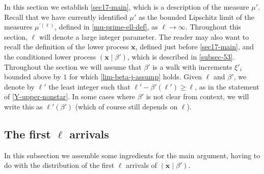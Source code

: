 \documentclass[11pt,reqno]{amsart}
\numberwithin{equation}{section}
\theoremstyle{definition}
\theoremstyle{remark}
\newcommand{\mbf}{\mathbf}
\renewcommand{\ge}{\geqslant}
\begin{document}
In this section we establish \cref{sec17-main}, which is a description of the measure $\mu'$. Recall that we have currently identified $\mu'$ as the bounded Lipschitz limit of the measures $\mu^{\prime (\ell)}$, defined in \cref{mu-prime-ell-def}, as $\ell \rightarrow \infty$. Throughout this section, $\ell$ will denote a large integer parameter.  The reader may also want to recall the definition of the lower process $\mbf{x}$, defined just before \cref{sec17-main}, and the conditioned lower process $(\mbf{x} \mid \beta')$, which is described in \cref{subsec-53}. Throughout the section we will assume that $\beta'$ is a walk with increments $\xi'_i$ bounded above by $1$ for which \cref{lim-beta-j-assump} holds. Given $\ell$ and $\beta'$, we denote by $\ell'$ the least integer such that $\ell' - \beta'(\ell') \ge \ell$, as in the statement of \cref{Y-upper-nonstar}. In some cases where $\beta'$ is not clear from context, we will write this as $\ell'(\beta')$ (which of course still depends on $\ell$). 

\subsection{The first $\ell$ arrivals} In this subsection we assemble some ingredients for the main argument, having to do with the distribution of the first $\ell$ arrivals of $(\mbf{x} \mid \beta')$. 
\end{document}
